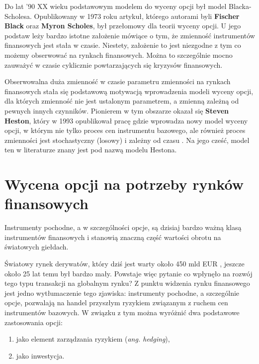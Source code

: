 \documentclass{pracamgr}
\begin{document}
Do lat '90 XX wieku podstawowym modelem do wyceny opcji był model Blacka-Scholesa. Opublikowany w 
1973  \cite{BlackScholes} roku artykuł, którego autorami 
byli \textbf{Fischer Black} oraz \textbf{Myron Scholes},
był przełomowy dla teorii wyceny opcji.
U jego podstaw leży bardzo istotne założenie mówiące o tym, że zmienność instrumentów finansowych 
jest stała w czasie. 
Niestety, założenie to jest niezgodne z tym co możemy obserwować na rynkach finansowych. 
Można to szczególnie mocno zauważyć w czasie cyklicznie powtarzających się kryzysów finansowych.

Obserwowalna duża zmienność w czasie parametru zmienności na rynkach finansowych stała się podstawową 
motywacją wprowadzenia modeli wyceny
opcji, dla których zmienność nie jest ustalonym parametrem, a zmienną zależną od pewnych innych 
czynników. Pionierem w tym obszarze okazał się \textbf{Steven Heston}, który w 
1993 opublikował pracę gdzie wprowadza nowy model wyceny opcji, w którym nie tylko proces cen 
instrumentu bazowego, ale również proces zmienności jest stochastyczny (losowy) i zależny od 
czasu \cite{Heston}. Na jego cześć, model ten w literaturze znany jest pod nazwą modelu Hestona.
 

\section{Wycena opcji na potrzeby rynków finansowych} %

Instrumenty pochodne, a w szczególności opcje, są dzisiaj bardzo ważną klasą instrumentów finansowych 
i stanowią znaczną część wartości obrotu na światowych giełdach.

Światowy rynek derywatów, który dziś jest warty około 450 mld EUR  \cite{GlobalDerMarket}, jeszcze 
około 25 lat temu był bardzo mały. Powstaje więc pytanie co wpłynęło na rozwój tego typu transakcji 
na globalnym rynku? Z punktu widzenia rynku finansowego jest jedno wytłumaczenie tego zjawiska:
instrumenty pochodne, a szczególnie opcje, pozwalają na handel przyszłym ryzykiem związanym z ruchem 
cen instrumentów bazowych. W związku z tym można wyróżnić dwa podstawowe 
zastosowania opcji: 

\begin{enumerate}
  \item jako element zarządzania ryzykiem (\textit{ang. hedging}),
  \item jako inwestycja.
\end{enumerate}
\end{document}
